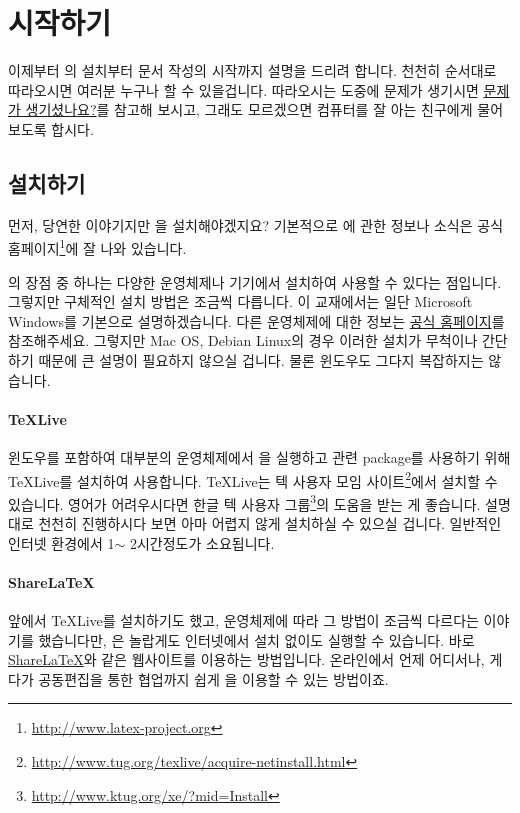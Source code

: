
\section{\lt{} 시작하기}
\label{sec:beginning}

이제부터 \lt 의 설치부터 문서 작성의 시작까지 설명을 드리려 합니다.
천천히 순서대로 따라오시면 여러분 누구나 할 수 있을겁니다.
따라오시는 도중에 문제가 생기시면 \hyperref[sec2:problem]{문제가 생기셨나요?}를 참고해 보시고, 그래도 모르겠으면 컴퓨터를 잘 아는 친구에게 물어보도록 합시다.

\subsection{\lt{} 설치하기}
\label{sec:lt-install}
먼저, 당연한 이야기지만 \lt 을 설치해야겠지요? 기본적으로 \lt 에 관한 정보나 소식은 공식 홈페이지\footnote{\url{http://www.latex-project.org}}에 잘 나와 있습니다.

\lt 의 장점 중 하나는 다양한 운영체제나 기기에서 설치하여 사용할 수 있다는 점입니다. 그렇지만 구체적인 설치 방법은 조금씩 다릅니다. 이 교재에서는 일단 Microsoft Windows를 기본으로 설명하겠습니다. 다른 운영체제에 대한 정보는 \href{http://www.latex-project.org}{공식 홈페이지}를 참조해주세요. 그렇지만 Mac OS, Debian Linux의 경우 이러한 설치가 무척이나 간단하기 때문에 큰 설명이 필요하지 않으실 겁니다. 물론 윈도우도 그다지 복잡하지는 않습니다.

\paragraph{\TeX Live}
윈도우를 포함하여 대부분의 운영체제에서 \lt 을 실행하고 관련 package를 사용하기 위해 \TeX Live를 설치하여 사용합니다. \TeX Live는 텍 사용자 모임 사이트\footnote{\url{http://www.tug.org/texlive/acquire-netinstall.html}}에서 설치할 수 있습니다. 영어가 어려우시다면 한글 텍 사용자 그룹\footnote{\url{http://www.ktug.org/xe/?mid=Install}}의 도움을 받는 게 좋습니다. 설명대로 천천히 진행하시다 보면 아마 어렵지 않게 설치하실 수 있으실 겁니다. 일반적인 인터넷 환경에서 1$\sim$ 2시간정도가 소요됩니다.

\paragraph{ShareLaTeX}
앞에서 \TeX Live를 설치하기도 했고, 운영체제에 따라 그 방법이 조금씩 다르다는 이야기를 했습니다만, \lt 은 놀랍게도 인터넷에서 설치 없이도 실행할 수 있습니다. 바로 \href{https://www.sharelatex.com/}{ShareLaTeX}와 같은 웹사이트를 이용하는 방법입니다. 온라인에서 언제 어디서나, 게다가 공동편집을 통한 협업까지 쉽게 \lt 을 이용할 수 있는 방법이죠.


